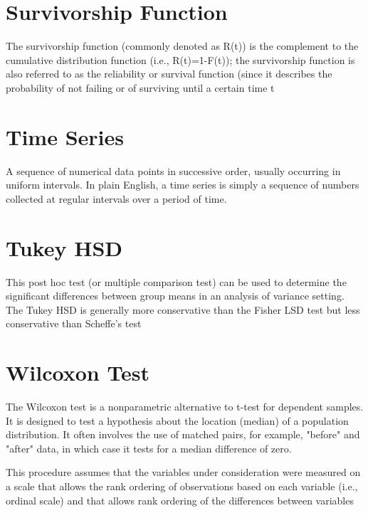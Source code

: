 \section{Survivorship Function}
The survivorship function (commonly denoted as R(t)) is the complement to the cumulative distribution function
(i.e., R(t)=1-F(t)); the survivorship function is also referred to as the reliability or survival function (since it describes the probability of not failing or of surviving until a certain time t
\section{Time Series}

A sequence of numerical data points in successive order, usually occurring in uniform intervals. In plain English, a time series is simply a sequence of numbers collected at regular intervals over a period of time.





\section{Tukey HSD}

This post hoc test (or multiple comparison test) can be used to determine the significant differences between group means in an analysis of variance setting. The Tukey HSD is generally more conservative than the Fisher LSD test but less conservative than Scheffe's test
\section{Wilcoxon Test}

The Wilcoxon test is a nonparametric alternative to t-test for dependent samples. It is designed to test a hypothesis about the location (median) of a population distribution. It often involves the use of matched pairs, for example, "before" and "after" data, in which case it tests for a median difference of zero.

This procedure assumes that the variables under consideration were measured on a scale that allows the rank ordering of observations based on each variable (i.e., ordinal scale) and that allows rank ordering of the differences between variables








